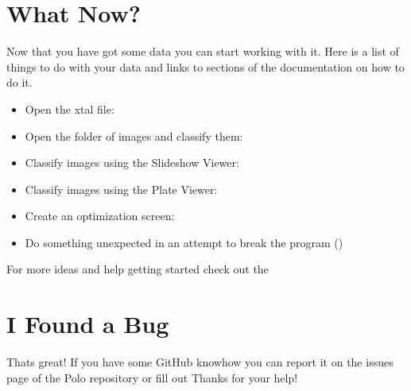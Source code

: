 \documentclass[letterpaper,10pt,english]{sphinxmanual}
\begin{document}
\section{What Now?}
\label{\detokenize{beta_testers:what-now}}
Now that you have got some data you can start working with it. Here is a list
of things to do with your data and links to sections of the documentation
on how to do it.
\begin{itemize}
\item {} 
Open the xtal file: {\hyperref[\detokenize{user_guide:importing-images-from-a-directory}]{}}

\item {} 
Open the folder of images and classify them: {\hyperref[\detokenize{user_guide:importing-a-saved-run}]{}}

\item {} 
Classify images using the Slideshow Viewer: {\hyperref[\detokenize{user_guide:using-the-slideshow-view}]{}}

\item {} 
Classify images using the Plate Viewer: {\hyperref[\detokenize{user_guide:using-the-plate-viewer}]{}}

\item {} 
Create an optimization screen: {\hyperref[\detokenize{user_guide:using-the-optimize-tool}]{}}

\item {} 
Do something unexpected in an attempt to break the program ()

\end{itemize}

For more ideas and help getting started check out the {\hyperref[\detokenize{user_guide:user-s-guide}]{}}


\section{I Found a Bug}
\label{\detokenize{beta_testers:i-found-a-bug}}
Thats great! If you have some GitHub knowhow you can report it on the issues
page of the Polo repository or fill out 
Thanks for your help!
\end{document}
